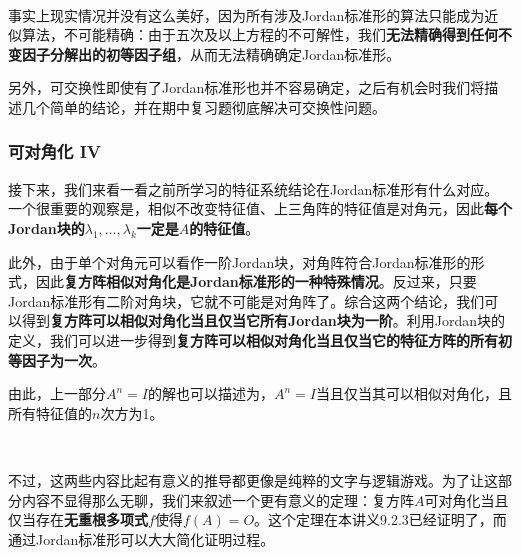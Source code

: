 \documentclass[a4paper,UTF8,fontset=windows,AutoFakeBold]{ctexart}
\newcommand*{\note}{\noindent *}
\begin{document}
\

\note 事实上现实情况并没有这么美好，因为所有涉及Jordan标准形的算法只能成为近似算法，不可能精确：由于五次及以上方程的不可解性，我们\textbf{无法精确得到任何不变因子分解出的初等因子组}，从而无法精确确定Jordan标准形。

\note 另外，可交换性即使有了Jordan标准形也并不容易确定，之后有机会时我们将描述几个简单的结论，并在期中复习题彻底解决可交换性问题。

\subsubsection{可对角化 IV}
接下来，我们来看一看之前所学习的特征系统结论在Jordan标准形有什么对应。一个很重要的观察是，相似不改变特征值、上三角阵的特征值是对角元，因此\textbf{每个Jordan块的$\lambda_1,\dots,\lambda_k$一定是$A$的特征值}。

此外，由于单个对角元可以看作一阶Jordan块，对角阵符合Jordan标准形的形式，因此\textbf{复方阵相似对角化是Jordan标准形的一种特殊情况}。反过来，只要Jordan标准形有二阶对角块，它就不可能是对角阵了。综合这两个结论，我们可以得到\textbf{复方阵可以相似对角化当且仅当它所有Jordan块为一阶}。利用Jordan块的定义，我们可以进一步得到\textbf{复方阵可以相似对角化当且仅当它的特征方阵的所有初等因子为一次}。

\note 由此，上一部分$A^n=I$的解也可以描述为，$A^n=I$当且仅当其可以相似对角化，且所有特征值的$n$次方为1。

\

不过，这两些内容比起有意义的推导都更像是纯粹的文字与逻辑游戏。为了让这部分内容不显得那么无聊，我们来叙述一个更有意义的定理：复方阵$A$可对角化当且仅当存在\textbf{无重根多项式}$f$使得$f(A)=O$。这个定理在本讲义9.2.3已经证明了，而通过Jordan标准形可以大大简化证明过程。
\end{document}
